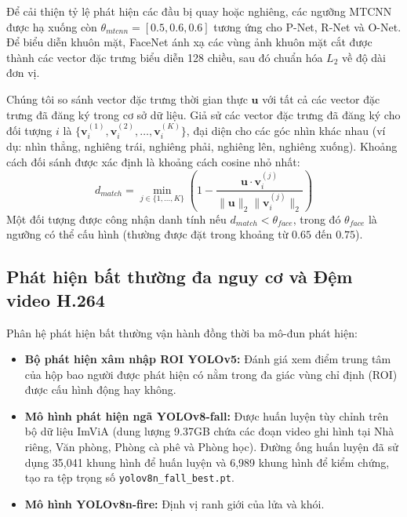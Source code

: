 \documentclass[12pt,a4paper]{article}
\begin{document}
Để cải thiện tỷ lệ phát hiện các đầu bị quay hoặc nghiêng, các ngưỡng MTCNN được hạ xuống còn $\theta_{mtcnn} = [0.5, 0.6, 0.6]$ tương ứng cho P-Net, R-Net và O-Net. Để biểu diễn khuôn mặt, FaceNet ánh xạ các vùng ảnh khuôn mặt cắt được thành các vector đặc trưng biểu diễn 128 chiều, sau đó chuẩn hóa $L_2$ về độ dài đơn vị.

Chúng tôi so sánh vector đặc trưng thời gian thực $\mathbf{u}$ với tất cả các vector đặc trưng đã đăng ký trong cơ sở dữ liệu. Giả sử các vector đặc trưng đã đăng ký cho đối tượng $i$ là $\{\mathbf{v}_i^{(1)}, \mathbf{v}_i^{(2)}, \dots, \mathbf{v}_i^{(K)}\}$, đại diện cho các góc nhìn khác nhau (ví dụ: nhìn thẳng, nghiêng trái, nghiêng phải, nghiêng lên, nghiêng xuống). Khoảng cách đối sánh được xác định là khoảng cách cosine nhỏ nhất:
\begin{equation}
    d_{match} = \min_{j \in \{1,\dots,K\}} \left( 1 - \frac{\mathbf{u} \cdot \mathbf{v}_i^{(j)}}{\|\mathbf{u}\|_2 \|\mathbf{v}_i^{(j)}\|_2} \right)
\end{equation}
Một đối tượng được công nhận danh tính nếu $d_{match} < \theta_{face}$, trong đó $\theta_{face}$ là ngưỡng có thể cấu hình (thường được đặt trong khoảng từ $0.65$ đến $0.75$).

\subsection{Phát hiện bất thường đa nguy cơ và Đệm video H.264}
Phân hệ phát hiện bất thường vận hành đồng thời ba mô-đun phát hiện:
\begin{itemize}
    \item \textbf{Bộ phát hiện xâm nhập ROI YOLOv5:} Đánh giá xem điểm trung tâm của hộp bao người được phát hiện có nằm trong đa giác vùng chỉ định (ROI) được cấu hình động hay không.
    \item \textbf{Mô hình phát hiện ngã YOLOv8-fall:} Được huấn luyện tùy chỉnh trên bộ dữ liệu ImViA (dung lượng 9.37GB chứa các đoạn video ghi hình tại Nhà riêng, Văn phòng, Phòng cà phê và Phòng học). Đường ống huấn luyện đã sử dụng 35,041 khung hình để huấn luyện và 6,989 khung hình để kiểm chứng, tạo ra tệp trọng số \texttt{yolov8n\_fall\_best.pt}.
    \item \textbf{Mô hình YOLOv8n-fire:} Định vị ranh giới của lửa và khói.
\end{itemize}
\end{document}
